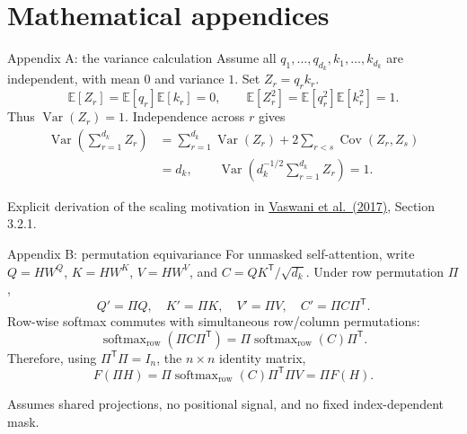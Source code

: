 \documentclass[aspectratio=169,11pt]{beamer}
\newcommand{\E}{\mathbb{E}}
\newcommand{\T}{\mathsf{T}}
\newcommand{\src}[1]{\par\vfill{\fontsize{7}{8.5}\selectfont\color{muted}#1}\par}
\newcommand{\paper}{\href{https://arxiv.org/abs/1706.03762}{Vaswani et al.\ (2017)}}
\DeclareMathOperator{\softmax}{softmax}
\DeclareMathOperator{\Var}{Var}
\begin{document}
\appendix
\section{Mathematical appendices}
\begin{frame}[t]{Appendix A: the variance calculation}
Assume all $q_1,\ldots,q_{d_k},k_1,\ldots,k_{d_k}$ are independent,
with mean $0$ and variance $1$. Set $Z_r=q_rk_r$.
\[
 \E[Z_r]=\E[q_r]\E[k_r]=0,\qquad
 \E[Z_r^2]=\E[q_r^2]\E[k_r^2]=1.
\]
Thus $\Var(Z_r)=1$. Independence across $r$ gives
\[
\begin{aligned}
 \Var\!\left(\sum_{r=1}^{d_k}Z_r\right)
 &=\sum_{r=1}^{d_k}\Var(Z_r)
   +2\sum_{r<s}\operatorname{Cov}(Z_r,Z_s)\\
 &=d_k,\qquad
 \Var\!\left(d_k^{-1/2}\sum_{r=1}^{d_k}Z_r\right)=1.
\end{aligned}
\]
\src{Explicit derivation of the scaling motivation in \paper, Section 3.2.1.}
\end{frame}

\begin{frame}[t]{Appendix B: permutation equivariance}
For unmasked self-attention, write $Q=HW^Q$, $K=HW^K$, $V=HW^V$,
and $C=QK^{\T}/\sqrt{d_k}$. Under row permutation $\Pi$,
\[
 Q'=\Pi Q,\quad K'=\Pi K,\quad V'=\Pi V,\quad
 C'=\Pi C\Pi^{\T}.
\]
Row-wise softmax commutes with simultaneous row/column permutations:
\[
 \softmax_{\mathrm{row}}(\Pi C\Pi^{\T})
   =\Pi\softmax_{\mathrm{row}}(C)\Pi^{\T}.
\]
Therefore, using $\Pi^{\T}\Pi=I_n$, the $n\times n$ identity matrix,
\[
 F(\Pi H)=\Pi\softmax_{\mathrm{row}}(C)\Pi^{\T}\Pi V=\Pi F(H).
\]
\src{Assumes shared projections, no positional signal, and no fixed index-dependent mask.}
\end{frame}
\end{document}
